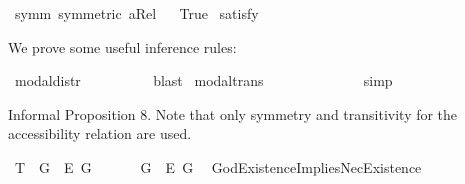 \begin{isabellebody}
\ symm{\isacharcolon}\ {\isachardoublequoteopen}symmetric\ aRel{\isachardoublequoteclose}\isanewline
\ \isanewline
{}\isamarkupfalse%
\ True\ \isamarkupfalse%
{\isacharbrackleft}satisfy{\isacharbrackright}%
\ %
%
\isamarkupfalse%
\ %
%
%
%
%
\begin{isamarkuptext}%
We prove some useful inference rules:%
\end{isamarkuptext}\isamarkuptrue%
\isamarkupfalse%
\ modal{\isacharunderscore}distr{\isacharcolon}\ {\isachardoublequoteopen}{\isasymlfloor}\isactrlbold {\isasymbox}{\isacharparenleft}{\isasymphi}\ \isactrlbold {\isasymrightarrow}\ {\isasympsi}{\isacharparenright}{\isasymrfloor}\ {\isasymLongrightarrow}\ {\isasymlfloor}{\isacharparenleft}\isactrlbold {\isasymdiamond}{\isasymphi}\ \isactrlbold {\isasymrightarrow}\ \isactrlbold {\isasymdiamond}{\isasympsi}{\isacharparenright}{\isasymrfloor}{\isachardoublequoteclose}%
\ %
%
\isamarkupfalse%
\ blast%
%
%
\isanewline
{}\isamarkupfalse%
\ modal{\isacharunderscore}trans{\isacharcolon}\ {\isachardoublequoteopen}{\isacharparenleft}{\isasymlfloor}{\isasymphi}\ \isactrlbold {\isasymrightarrow}\ {\isasympsi}{\isasymrfloor}\ {\isasymand}\ {\isasymlfloor}{\isasympsi}\ \isactrlbold {\isasymrightarrow}\ {\isasymchi}{\isasymrfloor}{\isacharparenright}\ {\isasymLongrightarrow}\ {\isasymlfloor}{\isasymphi}\ \isactrlbold {\isasymrightarrow}\ {\isasymchi}{\isasymrfloor}{\isachardoublequoteclose}%
\ %
%
\isamarkupfalse%
\ simp%
%
%
%
\begin{isamarkuptext}%
Informal Proposition 8. Note that only symmetry and transitivity for the accessibility relation are used.%
\end{isamarkuptext}\isamarkuptrue%
\isamarkupfalse%
\ T{}{\isacharcolon}\ {\isachardoublequoteopen}{\isasymlfloor}\isactrlbold {\isasymdiamond}\isactrlbold {\isasymexists}\ G{\isasymrfloor}\ {\isasymlongrightarrow}\ {\isasymlfloor}\isactrlbold {\isasymbox}\isactrlbold {\isasymexists}\isactrlsup E\ G{\isasymrfloor}{\isachardoublequoteclose}\isanewline
%
%
%
\isamarkupfalse%
\ {\isacharminus}\isanewline
\ \ \isamarkupfalse%
\ {\isachardoublequoteopen}{\isasymlfloor}\isactrlbold {\isasymexists}\ G\ \isactrlbold {\isasymrightarrow}\ \isactrlbold {\isasymbox}\isactrlbold {\isasymexists}\isactrlsup E\ G{\isasymrfloor}{\isachardoublequoteclose}\ \isamarkupfalse%
\ GodExistenceImpliesNecExistence\ \isanewline

\end{isabellebody}
